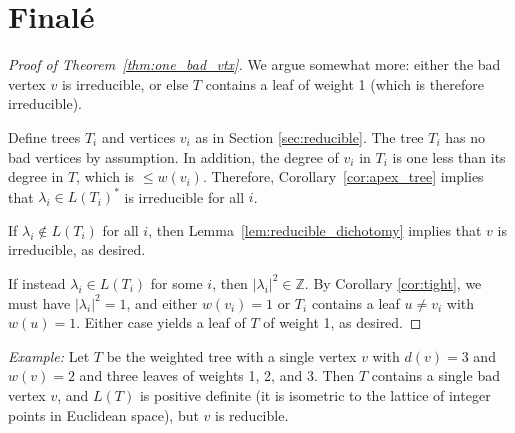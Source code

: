 \documentclass[11pt]{amsart}
\numberwithin{equation}{section}
\def\bZ{{\mathbb Z}}
\begin{document}
\section{Final\'e}

\begin{proof}[Proof of Theorem~\ref{thm:one_bad_vtx}]
 We argue somewhat more: either the bad vertex $v$ is irreducible, or else $T$ contains a leaf of weight 1 (which is therefore irreducible).

Define trees $T_i$ and vertices $v_i$ as in Section \ref{sec:reducible}.
The tree $T_i$ has no bad vertices by assumption.
In addition, the degree of $v_i$ in $T_i$ is one less than its degree in $T$, which is $\le w(v_i)$.
Therefore, Corollary~\ref{cor:apex_tree} implies that $\lambda_i \in L(T_i)^*$ is irreducible for all $i$.

If $\lambda_i \notin L(T_i)$ for all $i$, then Lemma~\ref{lem:reducible_dichotomy} implies that $v$ is irreducible, as desired.

If instead $\lambda_i \in L(T_i)$ for some $i$, then $|\lambda_i|^2 \in \bZ$.
By Corollary \ref{cor:tight}, we must have $|\lambda_i|^2=1$, and either $w(v_i) = 1$ or $T_i$ contains a leaf $u \ne v_i$ with $w(u)=1$.
Either case yields a leaf of $T$ of weight 1, as desired.
\end{proof}

\noindent
{\em Example:} Let $T$ be the weighted tree with a single vertex $v$ with $d(v) = 3 $ and $w(v) = 2$ and three leaves of weights 1, 2, and 3.  Then $T$ contains a single bad vertex $v$, and $L(T)$ is positive definite (it is isometric to the lattice of integer points in Euclidean space), but $v$ is reducible.
\end{document}

